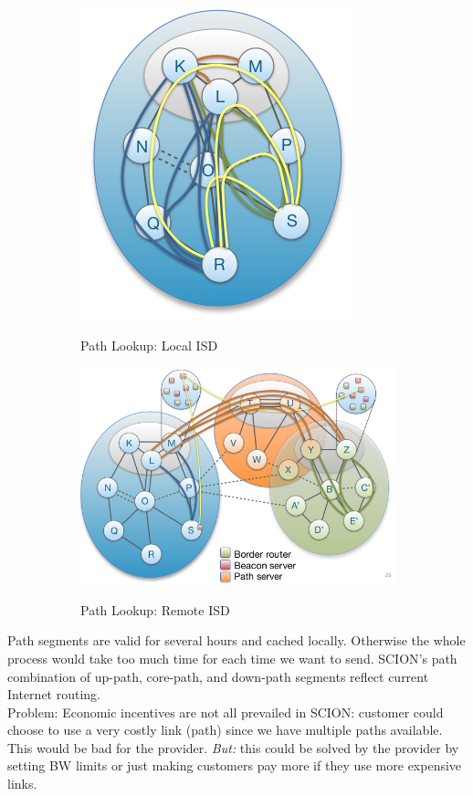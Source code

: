 \documentclass[11pt,oneside,a4paper]{article}
\begin{document}
\begin{figure}[t!]
	\centering
	\begin{subfigure}[t]{.5\textwidth}
		\centering
		\includegraphics[width=0.5\linewidth]{figures/scion_pathlookup_localisd}
		\label{fig:scion_pathlookup_localisd}
		\caption{Path Lookup: Local ISD}
	\end{subfigure}%
	\begin{subfigure}[t]{.5\textwidth}
		\centering
		\includegraphics[width=0.7\linewidth]{figures/scion_pathlookup_remoteisd}
		\label{fig:scion_pathlookup_remoteisd}
		\caption{Path Lookup: Remote ISD}
	\end{subfigure}
	\caption{}
\end{figure}

Path segments are valid for several hours and cached locally. Otherwise the whole process would take too much time for each time we want to send. SCION’s path combination of up-path, core-path, and down-path segments reflect current Internet routing.\\

Problem: Economic incentives are not all prevailed in SCION: customer could choose to use a very costly link (path) since we have multiple paths available. This would be bad for the provider. \textit{But:} this could be solved by the provider by setting BW limits or just making customers pay more if they use more expensive links.
\end{document}
